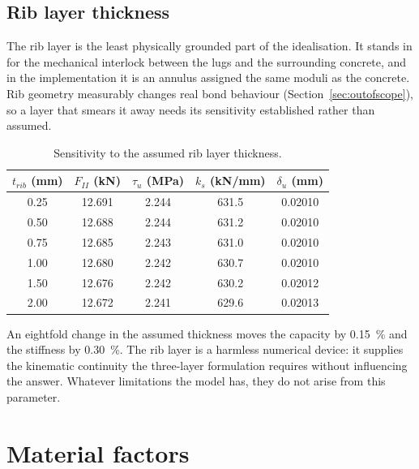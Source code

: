 \subsection{Rib layer thickness}
\label{sec:ribthick}

The rib layer is the least physically grounded part of the idealisation. It
stands in for the mechanical interlock between the lugs and the surrounding
concrete, and in the implementation it is an annulus assigned the same
moduli as the concrete. Rib geometry measurably changes real bond
behaviour (Section~\ref{sec:outofscope}), so a layer that smears it away
needs its sensitivity established rather than assumed.

\begin{table}[H]
\centering
\caption{Sensitivity to the assumed rib layer thickness.}
\label{tab:sweeprib}
\small
\begin{tabular*}{\linewidth}{@{\extracolsep{\fill}}ccccc@{}}
\hline
$t_{rib}$ (mm) & $F_{II}$ (kN) & $\tau_u$ (MPa) & $k_s$ (kN/mm)
               & $\delta_u$ (mm) \\
\hline
0.25 & 12.691 & 2.244 & 631.5 & 0.02010 \\
0.50 & 12.688 & 2.244 & 631.2 & 0.02010 \\
0.75 & 12.685 & 2.243 & 631.0 & 0.02010 \\
1.00 & 12.680 & 2.242 & 630.7 & 0.02010 \\
1.50 & 12.676 & 2.242 & 630.2 & 0.02012 \\
2.00 & 12.672 & 2.241 & 629.6 & 0.02013 \\
\hline
\end{tabular*}
\end{table}

An eightfold change in the assumed thickness moves the capacity by
\SI{0.15}{\percent} and the stiffness by \SI{0.30}{\percent}. The rib layer
is a harmless numerical device: it supplies
the kinematic continuity the three-layer formulation requires without
influencing the answer. Whatever limitations the model has, they do not
arise from this parameter.


\section{Material factors}
\label{sec:matfactors}

